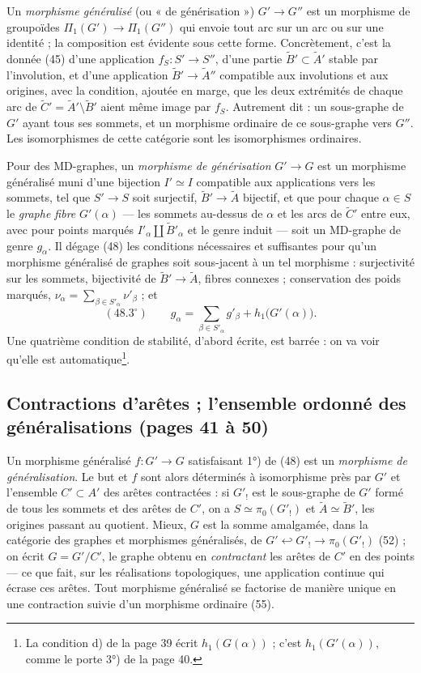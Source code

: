 \documentclass[11pt,a4paper]{article}
\begin{document}
Un \emph{morphisme généralisé} (ou « de générisation ») $G' \to G''$ est un
morphisme de groupoïdes $\Pi_1(G') \to \Pi_1(G'')$ qui envoie tout arc sur un arc
ou sur une identité ; la composition est évidente sous cette forme. Concrètement,
c'est la donnée (45) d'une application $f_S : S' \to S''$, d'une partie
$\widetilde{B}' \subset \widetilde{A}'$ stable par l'involution, et d'une
application $\widetilde{B}' \to \widetilde{A}''$ compatible aux involutions et aux
origines, avec la condition, ajoutée en marge, que les deux extrémités de chaque
arc de $\widetilde{C}' = \widetilde{A}' \setminus \widetilde{B}'$ aient même image
par $f_S$. Autrement dit : un sous-graphe de $G'$ ayant tous ses sommets, et un
morphisme ordinaire de ce sous-graphe vers $G''$. Les isomorphismes de cette
catégorie sont les isomorphismes ordinaires.

Pour des MD-graphes, un \emph{morphisme de générisation} $G' \to G$ est un
morphisme généralisé muni d'une bijection $I' \simeq I$ compatible aux applications
vers les sommets, tel que $S' \to S$ soit surjectif, $\widetilde{B}' \to
\widetilde{A}$ bijectif, et que pour chaque $\alpha \in S$ le \emph{graphe fibre}
$G'(\alpha)$ — les sommets au-dessus de $\alpha$ et les arcs de $\widetilde{C}'$
entre eux, avec pour points marqués $I'_\alpha \amalg \widetilde{B}'_\alpha$ et le
genre induit — soit un MD-graphe de genre $g_\alpha$. Il dégage (48) les
conditions nécessaires et suffisantes pour qu'un morphisme généralisé de graphes
soit sous-jacent à un tel morphisme : surjectivité sur les sommets, bijectivité
de $\widetilde{B}' \to \widetilde{A}$, fibres connexes ; conservation des poids
marqués, $\nu_\alpha = \sum_{\beta \in S'_\alpha} \nu'_\beta$ ; et
\[
(48.3^\circ) \qquad g_\alpha = \sum_{\beta \in S'_\alpha} g'_\beta +
h_1\bigl(G'(\alpha)\bigr) .
\]
Une quatrième condition de stabilité, d'abord écrite, est barrée : on va voir
qu'elle est automatique\footnote{La condition d) de la page 39 écrit
$h_1(G(\alpha))$ ; c'est $h_1(G'(\alpha))$, comme le porte 3°) de la page 40.}.

\subsection*{Contractions d'arêtes ; l'ensemble ordonné des généralisations (pages 41 à 50)}

Un morphisme généralisé $f : G' \to G$ satisfaisant 1°) de (48) est un
\emph{morphisme de généralisation}. Le but et $f$ sont alors déterminés à
isomorphisme près par $G'$ et l'ensemble $C' \subset A'$ des arêtes contractées :
si $G'_!$ est le sous-graphe de $G'$ formé de tous les sommets et des arêtes de
$C'$, on a $S \simeq \pi_0(G'_!)$ et $\widetilde{A} \simeq \widetilde{B}'$, les
origines passant au quotient. Mieux, $G$ est la somme amalgamée, dans la catégorie
des graphes et morphismes généralisés, de $G' \hookleftarrow G'_! \to
\pi_0(G'_!)$ (52) ; on écrit $G = G'/C'$, le graphe obtenu en \emph{contractant}
les arêtes de $C'$ en des points — ce que fait, sur les réalisations
topologiques, une application continue qui écrase ces arêtes. Tout morphisme
généralisé se factorise de manière unique en une contraction suivie d'un
morphisme ordinaire (55).
\end{document}
